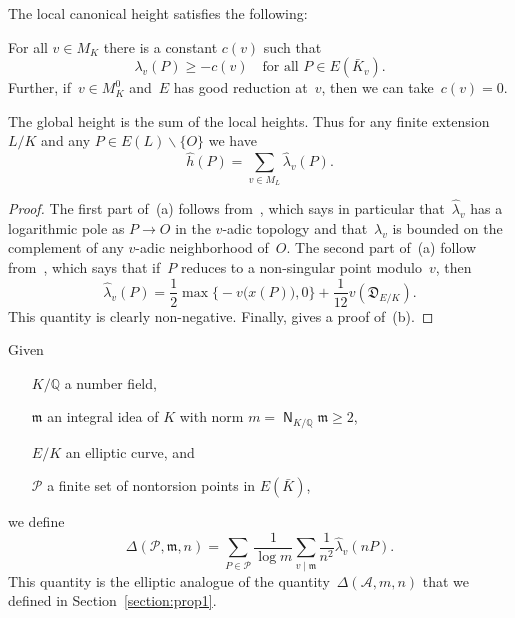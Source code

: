 \begin{proposition}
\label{prop:localhtproperties}
The local canonical height satisfies the following\textup:
\begin{parts}
{\item[\upshape{(a)}]}
For all $v\in M_K$ there is a constant $c(v)$ such that
\[
  {\lambda}_v(P)\ge -c(v)\quad\text{for all $P\in E({{\bar K}}_v)$.}
\]
Further, if~$v\in M_K^0$ and~$E$ has good reduction at~$v$, then
we can take~$c(v)=0$.
{\item[\upshape{(b)}]}
The global height is the sum of the local heights. Thus for any finite
extension $L/K$ and any $P\in E(L){\smallsetminus}\{O\}$ we have
\[
  {{\hat h}}(P) = \sum_{v\in M_L} {\hat\lambda}_v(P).
\]
\end{parts}
\end{proposition}
\begin{proof}
The first part of~(a) follows from~\cite[Theorem~VI.1.1(a)]{ATAEC}, 
which says in particular that~${\hat\lambda}_v$ has a logarithmic pole
as $P\to O$ in the $v$-adic topology and that~${\lambda}_v$ is bounded
on the complement of any $v$-adic neighborhood of~$O$. The second
part of~(a) follow from~\cite[Theorem~VI.4.1]{ATAEC}, which says that
if~$P$ reduces to a non-singular point modulo~$v$, then
\[
  {\hat\lambda}_v(P) = \frac12\max\bigl\{-v\bigl(x(P)\bigr),0\bigr\}
     +\frac1{12}v({{\mathfrak{D}}}_{E/K}).
\]
This quantity is clearly non-negative.  Finally,
\cite[Theorem~VI.2.1]{ATAEC} gives a proof of~(b).
\end{proof}

\begin{definition}
Given
\begin{itemize}
\item[$K/{\mathbb{Q}}$]
a number field,
\item[${{\mathfrak{m}}}$]
an integral idea of $K$ with norm $m={{\operatorname{\mathsf{N}}}}_{K/{\mathbb{Q}}}{{\mathfrak{m}}}\ge2$,
\item[$E/K$]
an elliptic curve, and
\item[${{\mathcal P}}$]
a finite set of nontorsion points in $E({{\bar K}})$,
\end{itemize}
we define
\[
  \Delta({{\mathcal P}},{{\mathfrak{m}}},n) =
  \sum_{P\in{{\mathcal P}}} \frac{1}{\log m}\sum_{v\mid{{\mathfrak{m}}}} \frac{1}{n^2} {\hat\lambda}_v(nP).
\]
This quantity is the elliptic analogue of the quantity~${\Delta}({{\mathcal A}},m,n)$
that we defined in Section~\ref{section:prop1}.
\end{definition}

